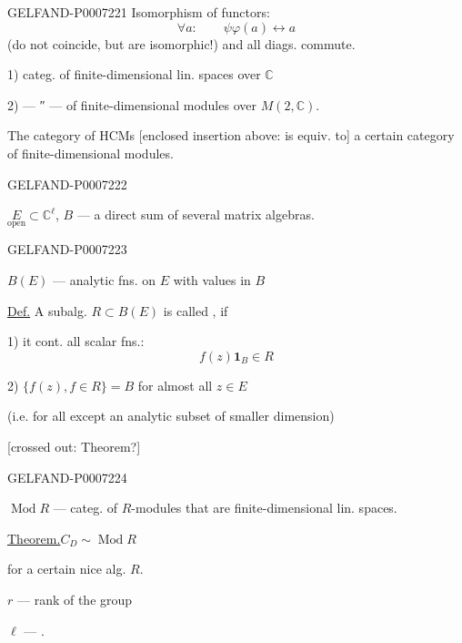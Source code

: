 \begin{GelfandAdjacentEvidence}{GELFAND-P000722}{1}
Isomorphism of functors:
\[
\forall a:\qquad\psi\varphi(a)\longleftrightarrow a
\]
(do not coincide, but are isomorphic!)
and all diags. commute.


1) categ. of finite-dimensional lin. spaces over \(\mathbb C\)

2) --- ″ --- of finite-dimensional modules over \(M(2,\mathbb C)\).

The category of HCMs [enclosed insertion above: is equiv. to] a certain category of finite-dimensional modules.
\end{GelfandAdjacentEvidence}
\begin{GelfandAdjacentEvidence}{GELFAND-P000722}{2}


\(\underset{\text{open}}{E}\subset\mathbb C^\ell\), \qquad \(B\) --- a direct sum of several matrix algebras.
\end{GelfandAdjacentEvidence}
\begin{GelfandAdjacentEvidence}{GELFAND-P000722}{3}


\(B(E)\) --- analytic fns. on \(E\) with values in \(B\)

\underline{\underline{Def.}} A subalg. \(R\subset B(E)\) is called
, if

1) it cont. all scalar fns.:
\[
f(z)\mathbf 1_B\in R
\]

2) \(\{f(z), f\in R\}=B\) for almost all \(z\in E\)

(i.e. for all except an analytic subset of smaller dimension)

[crossed out: Theorem?]
\end{GelfandAdjacentEvidence}
\begin{GelfandAdjacentEvidence}{GELFAND-P000722}{4}

\(\operatorname{Mod} R\) --- categ. of \(R\)-modules that are finite-dimensional lin. spaces.

\underline{Theorem.}\qquad \(C_D\sim\operatorname{Mod} R\)

for a certain nice alg. \(R\).

\(r\) --- rank of the group

\(\ell\) --- .
\end{GelfandAdjacentEvidence}
